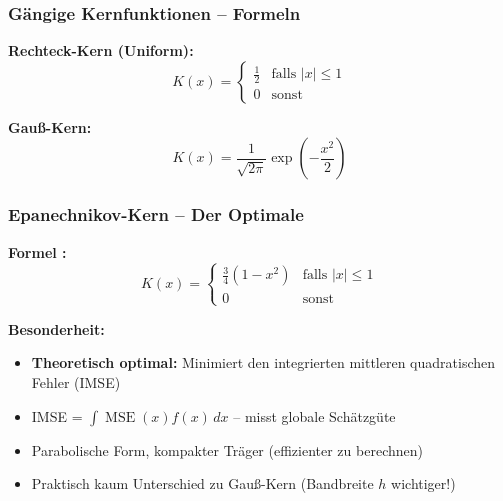 \documentclass{beamer}
\newif\ifpauseswitch
\begin{document}
	\begin{frame}
		\frametitle{Gängige Kernfunktionen – Formeln}
		
		\textbf{Rechteck-Kern (Uniform):}
		\[
		K(x) = \begin{cases}
			\frac{1}{2} & \text{falls } |x| \le 1 \\
			0 & \text{sonst}
		\end{cases}
		\]
		
		\ifpauseswitch
		\pause
		\fi
		
		\textbf{Gauß-Kern:}
		\[
		K(x) = \frac{1}{\sqrt{2\pi}} \exp\left(-\frac{x^2}{2}\right)
		\]
	\end{frame}
	
	\begin{frame}
		\frametitle{Epanechnikov-Kern – Der Optimale}
		
		\textbf{Formel \cite{Epanechnikov1969}:}
		\[
		K(x) = \begin{cases}
			\frac{3}{4}(1-x^2) & \text{falls } |x| \le 1 \\
			0 & \text{sonst}
		\end{cases}
		\]
		
		\vspace{0.5em}
		
		\textbf{Besonderheit:}
		\begin{itemize}
			\item \textbf{Theoretisch optimal:} Minimiert den integrierten mittleren quadratischen Fehler (IMSE)
			\item IMSE = $\int \operatorname{MSE}(x) f(x) \, dx$ – misst globale Schätzgüte
			\item Parabolische Form, kompakter Träger (effizienter zu berechnen)
			\item Praktisch kaum Unterschied zu Gauß-Kern (Bandbreite $h$ wichtiger!)
		\end{itemize}
	\end{frame}
	
\end{document}

